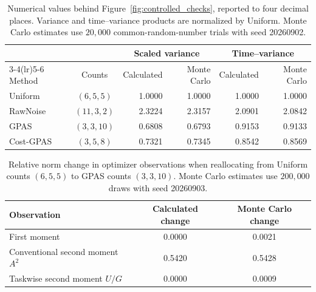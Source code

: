 \begin{table}[H]
\centering
\small
\caption{Numerical values behind Figure~\ref{fig:controlled_checks}, reported
to four decimal places. Variance and time--variance products are normalized
by Uniform. Monte Carlo estimates use $20{,}000$ common-random-number trials
with seed 20260902.}
\label{tab:controlled_allocation_values}
\setlength{\tabcolsep}{4.5pt}
\begin{tabular}{lcrrrr}
\toprule
& & \multicolumn{2}{c}{Scaled variance} &
\multicolumn{2}{c}{Time--variance} \\
\cmidrule(lr){3-4}\cmidrule(lr){5-6}
Method & Counts & Calculated & Monte Carlo & Calculated & Monte Carlo \\
\midrule
Uniform   & $(6,5,5)$  & 1.0000 & 1.0000 & 1.0000 & 1.0000 \\
RawNoise  & $(11,3,2)$ & 2.3224 & 2.3157 & 2.0901 & 2.0842 \\
GPAS      & $(3,3,10)$ & 0.6808 & 0.6793 & 0.9153 & 0.9133 \\
Cost-GPAS & $(3,5,8)$  & 0.7321 & 0.7345 & 0.8542 & 0.8569 \\
\bottomrule
\end{tabular}
\end{table}

\begin{table}[H]
\centering
\small
\caption{Relative norm change in optimizer observations when reallocating
from Uniform counts $(6,5,5)$ to GPAS counts $(3,3,10)$. Monte Carlo
estimates use $200{,}000$ draws with seed 20260903.}
\label{tab:controlled_moment_values}
\setlength{\tabcolsep}{7pt}
\begin{tabular}{lcc}
\toprule
Observation & Calculated change & Monte Carlo change \\
\midrule
First moment & 0.0000 & 0.0021 \\
Conventional second moment $A^2$ & 0.5420 & 0.5428 \\
Taskwise second moment $U/G$ & 0.0000 & 0.0009 \\
\bottomrule
\end{tabular}
\end{table}
